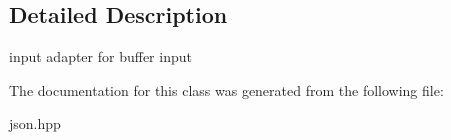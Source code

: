\subsection{Detailed Description}
input adapter for buffer input 

The documentation for this class was generated from the following file\+:\begin{DoxyCompactItemize}
\item 
json.\+hpp\end{DoxyCompactItemize}

